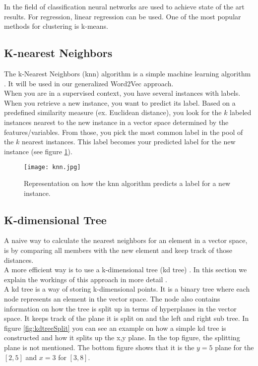 In the field of classification neural networks are used to achieve state of the art results. For regression, linear regression can be used. One of the most popular methods for clustering is k-means. 

	\subsection{K-nearest Neighbors}
	\label{sec:knn}
	
The k-Nearest Neighbors (knn) algorithm is a simple machine learning algorithm \cite{knn:article}. It will be used in our generalized Word2Vec approach. \\
When you are in a supervised context, you have several instances with labels. When you retrieve a new instance, you want to predict its label. Based on a predefined similarity measure (ex. Euclidean distance), you look for the $k$ labeled instances nearest to the new instance in a vector space determined by the features/variables. From those, you pick the most common label in the pool of the $k$ nearest instances. This label becomes your predicted label for the new instance (see figure \ref{fig:knn}).

\begin{figure}[!htb]
	\centering
	\texttt{[image: knn.jpg]}
	\caption{Representation on how the knn algorithm predicts a label for a new instance.}
	\label{fig:knn}
\end{figure}
	
	
	\subsection{K-dimensional Tree}
	\label{sec:kdtree}
	
A naive way to calculate the nearest neighbors for an element in a vector space, is by comparing all members with the new element and keep track of those distances. \\
A more efficient way is to use a k-dimensional tree (kd tree) \cite{kdtree:article}. In this section we explain the workings of this approach in more detail \cite{kdtreeIntro:atricle}. \\

A kd tree is a way of storing k-dimensional points. It is a binary tree where each node represents an element in the vector space. The node also contains information on how the tree is split up in terms of hyperplanes in the vector space. It keeps track of the plane it is split on and the left and right sub tree. In figure \ref{fig:kdtreeSplit} you can see an example on how a simple kd tree is constructed and how it splits up the x,y plane. In the top figure, the splitting plane is not mentioned. The bottom figure shows that it is the $y=5$ plane for the $[2,5]$ and $x=3$ for $[3,8]$. \\
	
